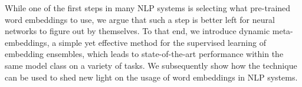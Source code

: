 While one of the first steps in many NLP systems is selecting what pre-trained word embeddings to use, we argue that such a step is better left for neural networks to figure out by themselves. To that end, we introduce dynamic meta-embeddings, a simple yet effective method for the supervised learning of embedding ensembles, which leads to state-of-the-art performance within the same model class on a variety of tasks. We subsequently show how the technique can be used to shed new light on the usage of word embeddings in NLP systems.

